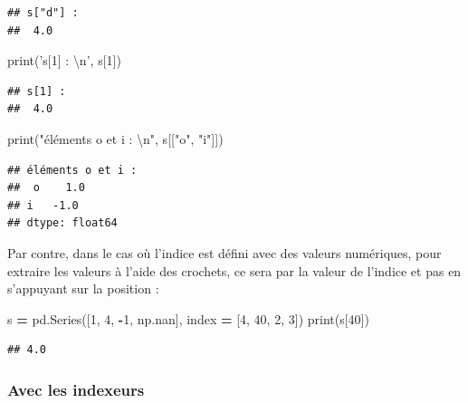 \documentclass[12pt,]{book}
\newenvironment{Shaded}{\begin{snugshade}}{\end{snugshade}}
\newcommand{\DecValTok}[1]{\textcolor[rgb]{0.00,0.00,0.81}{#1}}
\newcommand{\CharTok}[1]{\textcolor[rgb]{0.31,0.60,0.02}{#1}}
\newcommand{\StringTok}[1]{\textcolor[rgb]{0.31,0.60,0.02}{#1}}
\newcommand{\OperatorTok}[1]{\textcolor[rgb]{0.81,0.36,0.00}{\textbf{#1}}}
\newcommand{\BuiltInTok}[1]{#1}
\newcommand{\NormalTok}[1]{#1}
\numberwithin{equation}{section}
\numberwithin{countremarque}{section}
\begin{document}
\begin{lstlisting}
## s["d"] : 
##  4.0
\end{lstlisting}

\begin{Shaded}
\begin{Highlighting}[]
\BuiltInTok{print}\NormalTok{(}\StringTok{'s[1] : }\CharTok{\textbackslash{}n}\StringTok{'}\NormalTok{, s[}\DecValTok{1}\NormalTok{])}
\end{Highlighting}
\end{Shaded}

\begin{lstlisting}
## s[1] : 
##  4.0
\end{lstlisting}

\begin{Shaded}
\begin{Highlighting}[]
\BuiltInTok{print}\NormalTok{(}\StringTok{"éléments o et i : }\CharTok{\textbackslash{}n}\StringTok{"}\NormalTok{, s[[}\StringTok{"o"}\NormalTok{, }\StringTok{"i"}\NormalTok{]])}
\end{Highlighting}
\end{Shaded}

\begin{lstlisting}
## éléments o et i : 
##  o    1.0
## i   -1.0
## dtype: float64
\end{lstlisting}

Par contre, dans le cas où l'indice est défini avec des valeurs
numériques, pour extraire les valeurs à l'aide des crochets, ce sera par
la valeur de l'indice et pas en s'appuyant sur la position :

\begin{Shaded}
\begin{Highlighting}[]
\NormalTok{s }\OperatorTok{=}\NormalTok{ pd.Series([}\DecValTok{1}\NormalTok{, }\DecValTok{4}\NormalTok{, }\OperatorTok{-}\DecValTok{1}\NormalTok{, np.nan],}
\NormalTok{             index }\OperatorTok{=}\NormalTok{ [}\DecValTok{4}\NormalTok{, }\DecValTok{40}\NormalTok{, }\DecValTok{2}\NormalTok{, }\DecValTok{3}\NormalTok{])}
\BuiltInTok{print}\NormalTok{(s[}\DecValTok{40}\NormalTok{])}
\end{Highlighting}
\end{Shaded}

\begin{lstlisting}
## 4.0
\end{lstlisting}

\subsubsection{Avec les indexeurs}\label{avec-les-indexeurs}
\end{document}
